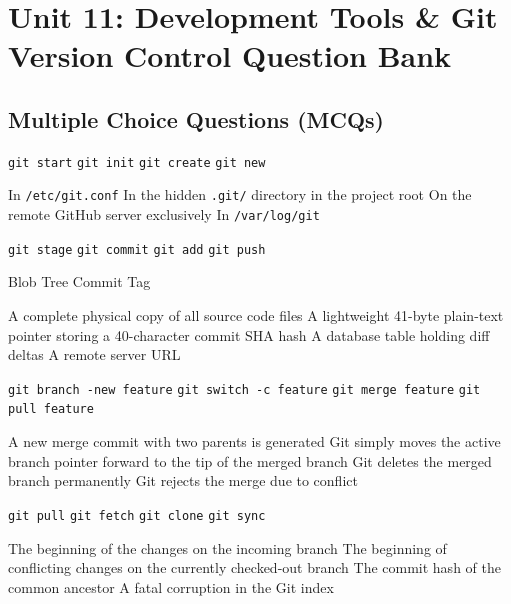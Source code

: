 \chapter{Unit 11: Development Tools \& Git Version Control Question Bank}

\section{Multiple Choice Questions (MCQs)}

{\texttt{git start}}
{\texttt{git init}}
{\texttt{git create}}
{\texttt{git new}}

{In \texttt{/etc/git.conf}}
{In the hidden \texttt{.git/} directory in the project root}
{On the remote GitHub server exclusively}
{In \texttt{/var/log/git}}

{\texttt{git stage}}
{\texttt{git commit}}
{\texttt{git add}}
{\texttt{git push}}

{Blob}
{Tree}
{Commit}
{Tag}

{A complete physical copy of all source code files}
{A lightweight 41-byte plain-text pointer storing a 40-character commit SHA hash}
{A database table holding diff deltas}
{A remote server URL}

{\texttt{git branch -new feature}}
{\texttt{git switch -c feature}}
{\texttt{git merge feature}}
{\texttt{git pull feature}}

{A new merge commit with two parents is generated}
{Git simply moves the active branch pointer forward to the tip of the merged branch}
{Git deletes the merged branch permanently}
{Git rejects the merge due to conflict}

{\texttt{git pull}}
{\texttt{git fetch}}
{\texttt{git clone}}
{\texttt{git sync}}

{The beginning of the changes on the incoming branch}
{The beginning of conflicting changes on the currently checked-out branch}
{The commit hash of the common ancestor}
{A fatal corruption in the Git index}

